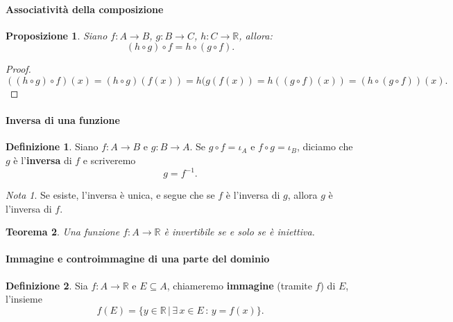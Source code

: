 \documentclass{article}
\theoremstyle{plain}
\newtheorem{thm}{Teorema}[section]
\newtheorem{prop}[thm]{Proposizione}
\theoremstyle{definition}
\newtheorem{defn}{Definizione}[section]
\theoremstyle{remark}
\newtheorem{note}{Nota}
\begin{document}
\paragraph{Associatività della composizione}
\begin{bxthm}
\begin{prop}
    Siano $f:A\to B$, $g:B\to C$, $h:C\to\mathbb{R}$, allora:
    \[
        (h\circ g)\circ f=h\circ (g\circ f).
    \]
\end{prop}
\end{bxthm}
\begin{proof}
    \[((h\circ g)\circ f)(x)= (h\circ g)(f(x)) = h(g(f(x)) = h((g\circ f)(x)) = (h\circ(g\circ f))(x).\]    
\end{proof}

\vspace{10pt}

\paragraph{Inversa di una funzione}
\begin{bxthm}
\begin{defn}
    Siano $f:A\to B$ e $g:B\to A$. Se $g\circ f=\iota_A$ e $f\circ g=\iota_B$, diciamo che $g$ è l'\textbf{inversa} di $f$ e scriveremo \[g=f^{-1}.\]
\end{defn}
\end{bxthm}

\vspace{10pt}

\begin{note}
    Se esiste, l'inversa è unica, e segue che se $f$ è l'inversa di $g$, allora $g$ è l'inversa di $f$.
\end{note}

\vspace{10pt}

\begin{bxthm}
\begin{thm}
    Una funzione $f:A\to\mathbb{R}$ è invertibile se e solo se è iniettiva.
\end{thm}
\end{bxthm}

\vspace{10pt}

\paragraph{Immagine e controimmagine di una parte del dominio}
\begin{bxthm}
\begin{defn}
    Sia $f:A\to\mathbb{R}$ e $E\subseteq A$, chiameremo \textbf{immagine} (tramite $f$) di $E$, 
    l'insieme 
    \[f(E)=\{y\in\mathbb{R}\,|\,\exists\, x\in E\,:\,y=f(x)\}.\]
\end{defn}
\end{bxthm}
\end{document}

